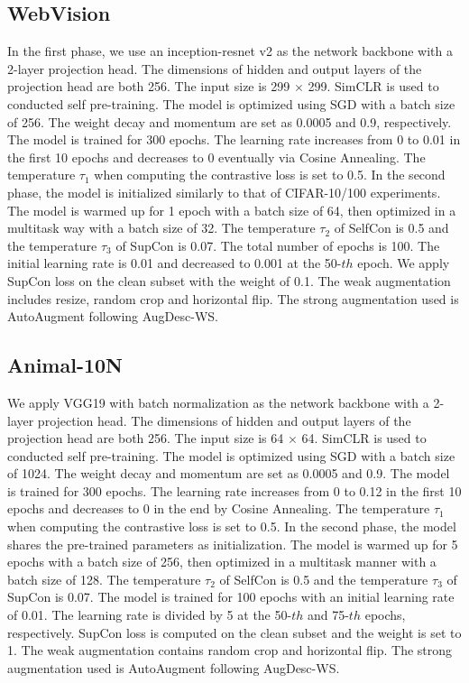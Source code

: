 \documentclass[letterpaper]{article} \usepackage{aaai22}  \usepackage{times}  \usepackage{helvet}  \usepackage{courier}  \usepackage[hyphens]{url}  \usepackage{graphicx} \usepackage{subfigure}
\begin{document}
\subsection{WebVision}
In the first phase, we use an inception-resnet v2 as the network backbone with a 2-layer projection head. The  dimensions of hidden and output layers of the projection head are both 256. The input size is 299 $\times$ 299. SimCLR is used to conducted self pre-training. The model is optimized using SGD with a batch size of 256. The weight decay and momentum are set as 0.0005 and 0.9, respectively. The model is trained for 300 epochs. The learning rate increases from 0 to 0.01 in the first 10 epochs and decreases to 0 eventually via Cosine Annealing. The temperature $\tau_1$ when computing the contrastive loss is set to 0.5. In the second phase, the model is initialized similarly to that of CIFAR-10/100 experiments. The model is warmed up for 1 epoch with a batch size of 64, then optimized in a multitask way with a batch size of 32. The temperature $\tau_2$ of SelfCon is 0.5 and the temperature $\tau_{3}$ of SupCon is 0.07. The total number of epochs is 100. The initial learning rate is 0.01 and decreased to 0.001 at the 50-$th$ epoch. We apply SupCon loss on the clean subset with the weight of 0.1. The weak augmentation includes resize, random crop and horizontal flip. The strong augmentation used is AutoAugment following AugDesc-WS. 

\subsection{Animal-10N}
We apply VGG19 with batch normalization as the network backbone with a 2-layer projection head. The dimensions of hidden and output layers of the projection head are both 256. The input size is 64 $\times$ 64. SimCLR is used to conducted self pre-training. The model is optimized using SGD with a batch size of 1024. The weight decay and momentum are set as 0.0005 and 0.9. The model is trained for 300 epochs. The learning rate increases from 0 to 0.12 in the first 10 epochs and decreases to 0 in the end by Cosine Annealing. The temperature $\tau_1$ when computing the contrastive loss is set to 0.5. In the second phase, the model shares the pre-trained parameters as initialization. The model is warmed up for 5 epochs with a batch size of 256, then optimized in a multitask manner with a batch size of 128. The temperature $\tau_2$ of SelfCon is 0.5 and the temperature $\tau_{3}$ of SupCon is 0.07. The model is trained for 100 epochs with an initial learning rate of 0.01. The learning rate is divided by 5 at the 50-$th$ and 75-$th$ epochs, respectively. SupCon loss is computed on the clean subset and the weight is set to 1. The weak augmentation contains random crop and horizontal flip. The strong augmentation used is AutoAugment following AugDesc-WS. 
\end{document}
